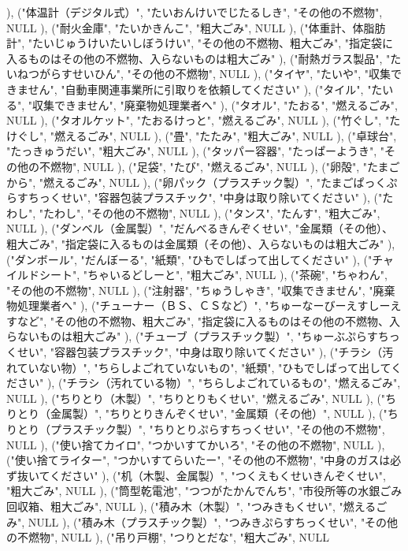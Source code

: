 ), ("体温計（デジタル式）", "たいおんけいでじたるしき", "その他の不燃物", NULL
), ("耐火金庫", "たいかきんこ", "粗大ごみ", NULL
), ("体重計、体脂肪計", "たいじゅうけいたいしぼうけい", "その他の不燃物、粗大ごみ", "指定袋に入るものはその他の不燃物、入らないものは粗大ごみ"
), ("耐熱ガラス製品", "たいねつがらすせいひん", "その他の不燃物", NULL
), ("タイヤ", "たいや", "収集できません", "自動車関連事業所に引取りを依頼してください"
), ("タイル", "たいる", "収集できません", "廃棄物処理業者へ"
), ("タオル", "たおる", "燃えるごみ", NULL
), ("タオルケット", "たおるけっと", "燃えるごみ", NULL
), ("竹ぐし", "たけぐし", "燃えるごみ", NULL
), ("畳", "たたみ", "粗大ごみ", NULL
), ("卓球台", "たっきゅうだい", "粗大ごみ", NULL
), ("タッパー容器", "たっぱーようき", "その他の不燃物", NULL
), ("足袋", "たび", "燃えるごみ", NULL
), ("卵殻", "たまごから", "燃えるごみ", NULL
), ("卵パック（プラスチック製）", "たまごぱっくぷらすちっくせい", "容器包装プラスチック", "中身は取り除いてください"
), ("たわし", "たわし", "その他の不燃物", NULL
), ("タンス", "たんす", "粗大ごみ", NULL
), ("ダンベル（金属製）", "だんべるきんぞくせい", "金属類（その他）、粗大ごみ", "指定袋に入るものは金属類（その他）、入らないものは粗大ごみ"
), ("ダンボール", "だんぼーる", "紙類", "ひもでしばって出してください"
), ("チャイルドシート", "ちゃいるどしーと", "粗大ごみ", NULL
), ("茶碗", "ちゃわん", "その他の不燃物", NULL
), ("注射器", "ちゅうしゃき", "収集できません", "廃棄物処理業者へ"
), ("チューナー（ＢＳ、ＣＳなど）", "ちゅーなーびーえすしーえすなど", "その他の不燃物、粗大ごみ", "指定袋に入るものはその他の不燃物、入らないものは粗大ごみ"
), ("チューブ（プラスチック製）", "ちゅーぶぷらすちっくせい", "容器包装プラスチック", "中身は取り除いてください"
), ("チラシ（汚れていない物）", "ちらしよごれていないもの", "紙類", "ひもでしばって出してください"
), ("チラシ（汚れている物）", "ちらしよごれているもの", "燃えるごみ", NULL
), ("ちりとり（木製）", "ちりとりもくせい", "燃えるごみ", NULL
), ("ちりとり（金属製）", "ちりとりきんぞくせい", "金属類（その他）", NULL
), ("ちりとり（プラスチック製）", "ちりとりぷらすちっくせい", "その他の不燃物", NULL
), ("使い捨てカイロ", "つかいすてかいろ", "その他の不燃物", NULL
), ("使い捨てライター", "つかいすてらいたー", "その他の不燃物", "中身のガスは必ず抜いてください"
), ("机（木製、金属製）", "つくえもくせいきんぞくせい", "粗大ごみ", NULL
), ("筒型乾電池", "つつがたかんでんち", "市役所等の水銀ごみ回収箱、粗大ごみ", NULL
), ("積み木（木製）", "つみきもくせい", "燃えるごみ", NULL
), ("積み木（プラスチック製）", "つみきぷらすちっくせい", "その他の不燃物", NULL
), ("吊り戸棚", "つりとだな", "粗大ごみ", NULL
